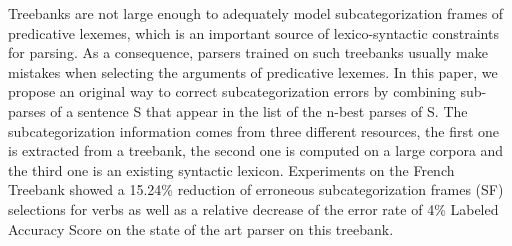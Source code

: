 Treebanks are not large enough to adequately model   subcategorization frames of predicative lexemes, which is an
   important source of lexico-syntactic constraints for parsing. As a
   consequence, parsers trained on such treebanks usually make mistakes
   when selecting the arguments of predicative lexemes. In this paper,
   we propose an original way to correct subcategorization errors by
   combining sub-parses of a sentence S that appear in the list of
   the n-best parses of S. The subcategorization information comes
   from three different resources, the first one is extracted from a
   treebank, the second one is computed on a large corpora and the
   third one is an existing syntactic lexicon. Experiments on the
   French Treebank showed a 15.24\% reduction of erroneous subcategorization
   frames (SF) selections for verbs as well as a relative decrease of the error
   rate of 4\% Labeled Accuracy Score on the state of the art parser on
   this treebank.

